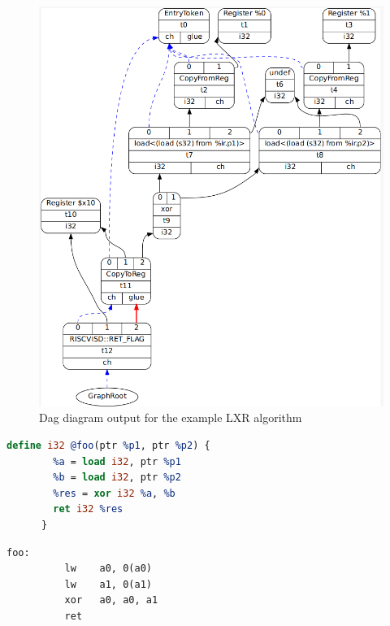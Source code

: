 \begin{figure}
    \centering
    \includegraphics[scale=0.4]{adding_new_instr/lxr_dag_diagram.png}
    \caption{Dag diagram output for the example LXR algorithm}
    \label{fig:lxr_dag_diagram}
\end{figure}

\begin{minipage}{\linewidth}
\begin{lstlisting}[caption={Intermediate Representation code input for LXR algorithm}, language=llvm, style=nasm]
    define i32 @foo(ptr %p1, ptr %p2) {
        %a = load i32, ptr %p1
        %b = load i32, ptr %p2
        %res = xor i32 %a, %b
        ret i32 %res
      }
\end{lstlisting}
\end{minipage}


\begin{lstlisting}[caption= Assembly output without LXR instruction]
      foo:                 
          lw	a0, 0(a0)
          lw	a1, 0(a1)
          xor	a0, a0, a1
          ret
\end{lstlisting}


